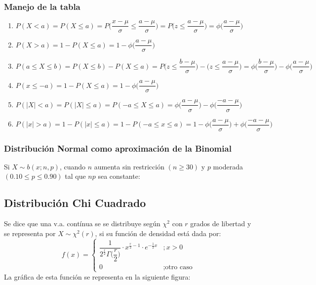 \subsubsection{Manejo de la tabla}
\begin{enumerate}
\item $P(X<a)=P(X\leq a) = P \Bigg( \dfrac{x-\mu}{\sigma}\leq\dfrac{a-\mu}{\sigma}\Bigg) 
= P\Bigg( z\leq \dfrac{a-\mu}{\sigma}\Bigg) 
=\phi\Bigg( \dfrac{a-\mu}{\sigma} \Bigg)$
\item 
$
P(X>a) =1-P(X\leq a) 
	 =1-\phi\Bigg(\dfrac{a-\mu}{\sigma}\Bigg)
$
\item 
$
P(a\leq X\leq b)= P(X\leq b)-P(X\leq a) 
                = P\Bigg(z\leq \dfrac{b-\mu}{\sigma}\Bigg)-\Bigg(z\leq \dfrac{a-\mu}{\sigma}\Bigg) 
                =\phi\Bigg(\dfrac{b-\mu}{\sigma}\Bigg)-\phi\Bigg(\dfrac{a-\mu}{\sigma}\Bigg)
$
\item 
$
P(x\leq -a) = 1-P(X\leq a)
            = 1-\phi\Bigg( \dfrac{a-\mu}{\sigma}\Bigg)
$
\item 
$P(|X|<a) = P(|X|\leq a) 
         = P(-a\leq X \leq a) 
         = \phi\Bigg(\dfrac{a-\mu}{\sigma}\Bigg)-\phi\Bigg(\dfrac{-a-\mu}{\sigma}\Bigg)$
\item $
P(|x|>a) = 1-P(|x|\leq a) 
	   = 1-P(-a \leq x \leq a) 
	   = 1 - \phi\Bigg(\dfrac{a-\mu}{\sigma}\Bigg)+\phi\Bigg(\dfrac{-a-\mu}{\sigma}\Bigg)$


\end{enumerate}
\subsubsection{Distribución Normal como aproximación de la Binomial}
Si $X\sim b(x;n,p)$, cuando $n$ aumenta sin restricción $(n\geq 30)$ y $p$ moderada $(0.10 \leq p \leq 0.90)$ tal que $np$ sea constante:
\subsection{Distribución Chi Cuadrado}
Se dice que una v.a. contínua se se distribuye según $\chi^2$ con $r$ grados de libertad y se representa por $X\sim\chi^2(r)$, si su función de densidad está dada por:
$$
f(x)=
\begin{cases}
\dfrac{1}{2^{\frac{r}{2}}\Gamma\Big( \dfrac{r}{2} \Big)}\cdot x^{\frac{r}{2}-1} \cdot e^{-\frac{1}{2}x} &; x>0 \\
0 &; \text{otro caso}
\end{cases}
$$
La gráfica de esta función se representa en la siguiente figura:


